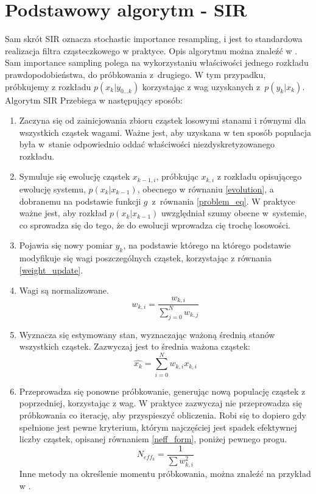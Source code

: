 \section{Podstawowy algorytm - SIR} \label{basic_algorithm}
Sam skrót SIR oznacza stochastic importance resampling, i jest to standardowa realizacja filtra cząsteczkowego w praktyce. Opis algorytmu można znaleźć w \cite{wiki_pf}. Sam importance sampling polega na wykorzystaniu właściwości jednego rozkładu prawdopodobieństwa, do próbkowania z~drugiego. W tym przypadku, próbkujemy z rozkładu $p(x_k|y_{0...k})$ korzystając z wag uzyskanych z~$p(y_k|x_k)$.
Algorytm SIR Przebiega w następujący sposób:
\begin{enumerate}[label=(\alph*)]
	\item Zaczyna się od zainicjowania zbioru cząstek losowymi stanami i równymi dla wszystkich cząstek wagami. Ważne jest, aby uzyskana w ten sposób populacja była w~stanie odpowiednio oddać właściwości niezdyskretyzowanego rozkładu. \label{pf_init_step}
	
	\item Symuluje się ewolucję cząstek $x_{k-1,i}$, próbkując $x_{k,i}$ z rozkładu opisującego ewolucję systemu, $p(x_k|x_{k-1})$, obecnego w równaniu \ref{evolution}, a dobranemu na podstawie funkcji $g$~z~równania \ref{problem_eq}. W praktyce ważne jest, aby rozkład $p(x_k|x_{k-1})$ uwzględniał szumy obecne w~systemie, co sprowadza się do tego, że do ewolucji wprowadza cię trochę losowości. \label{pf_drift_step}
	
	\item Pojawia się nowy pomiar $y_k$, na podstawie którego na którego podstawie modyfikuje się wagi poszczególnych cząstek, korzystając z równania \ref{weight_update}. \label{pf_reweight_step}

	\item Wagi są normalizowane. \label{pf_weight_normalization_step}
	\begin{equation}
		w_{k,i}=\frac{w_{k,i}}{\sum_{j=0}^{N} w_{k,j}}
	\end{equation}

	\item Wyznacza się estymowany stan, wyznaczając ważoną średnią stanów wszystkich cząstek. Zazwyczaj jest to średnia ważona cząstek: \label{pf_est_step}
	\begin{equation}
		\hat{x_k} = \sum_{i=0}^{N} w_{k,i} x_{k,i}
	\end{equation}
	\item Przeprowadza się ponowne próbkowanie, generując nową populację cząstek z poprzedniej, korzystając z wag. W praktyce zazwyczaj nie przeprowadza się próbkowania co iterację, aby przyspieszyć obliczenia. Robi się to dopiero gdy spełnione jest pewne kryterium, którym najczęściej jest spadek efektywnej liczby cząstek, opisanej równaniem \ref{neff_form}, poniżej pewnego progu.
	\begin{equation}\label{neff_form}
		N_{eff_k} = \dfrac{1}{\sum w_{k,i}^2}
	\end{equation}
	Inne metody na określenie momentu próbkowania, można znaleźć na przykład w \cite{adaptive_resampling}.\label{resampling_step}
\end{enumerate}
